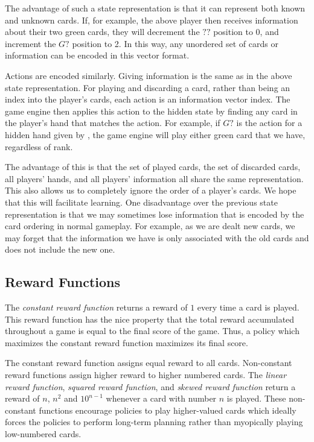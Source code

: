 The advantage of such a state representation is that it can represent both
known and unknown cards. If, for example, the above player then receives
information about their two green cards, they will decrement the $??$ position
to 0, and increment the $G?$ position to 2. In this way, any unordered set of
cards or information can be encoded in this vector format.

Actions are encoded similarly. Giving information is the same as in the above
state representation. For playing and discarding a card, rather than being an
index into the player's cards, each action is an information vector index.  The
game engine then applies this action to the hidden state by finding any card in
the player's hand that matches the action.  For example, if $G?$ is the action
for a hidden hand given by , the game engine will play
either green card that we have, regardless of rank.

The advantage of this is that the set of played cards, the set of
discarded cards, all players' hands, and all players' information all share the
same representation. This also allows us to completely ignore the order of a
player's cards. We hope that this will facilitate learning. One disadvantage
over the previous state representation is that we may sometimes lose
information that is encoded by the card ordering in normal gameplay. For
example, as we are dealt new cards, we may forget that the information we have
is only associated with the old cards and does not include the new one.

\subsection{Reward Functions}
The \emph{constant reward function} returns a reward of $1$ every time a card
is played. This reward function has the nice property that the total reward
accumulated throughout a game is equal to the final score of the game. Thus, a
policy which maximizes the constant reward function maximizes its final score.

The constant reward function assigns equal reward to all cards. Non-constant
reward functions assign higher reward to higher numbered cards. The
\emph{linear reward function}, \emph{squared reward function}, and \emph{skewed
reward function} return a reward of $n$, $n^2$ and $10^{n-1}$ whenever a card
with number $n$ is played. These non-constant functions encourage policies to
play higher-valued cards which ideally forces the policies to perform long-term
planning rather than myopically playing low-numbered cards.

